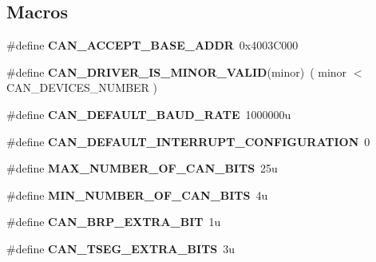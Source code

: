 \subsection*{Macros}
\begin{DoxyCompactItemize}
\item 
\mbox{\label{can-defs_8h_a551b07be3174f148c975a19fafe8d1cb}} 
\#define {\bfseries C\+A\+N\+\_\+\+A\+C\+C\+E\+P\+T\+\_\+\+B\+A\+S\+E\+\_\+\+A\+D\+DR}~0x4003\+C000
\item 
\mbox{\label{can-defs_8h_a30cc07249a05ab31dc3b727672c1c99f}} 
\#define {\bfseries C\+A\+N\+\_\+\+D\+R\+I\+V\+E\+R\+\_\+\+I\+S\+\_\+\+M\+I\+N\+O\+R\+\_\+\+V\+A\+L\+ID}(minor)~( minor $<$ C\+A\+N\+\_\+\+D\+E\+V\+I\+C\+E\+S\+\_\+\+N\+U\+M\+B\+ER )
\item 
\mbox{\label{can-defs_8h_a62afe677ba393f2f36c657982e986afd}} 
\#define {\bfseries C\+A\+N\+\_\+\+D\+E\+F\+A\+U\+L\+T\+\_\+\+B\+A\+U\+D\+\_\+\+R\+A\+TE}~1000000u
\item 
\mbox{\label{can-defs_8h_a23ea19e9ad414132e30e5f345dd1df1b}} 
\#define {\bfseries C\+A\+N\+\_\+\+D\+E\+F\+A\+U\+L\+T\+\_\+\+I\+N\+T\+E\+R\+R\+U\+P\+T\+\_\+\+C\+O\+N\+F\+I\+G\+U\+R\+A\+T\+I\+ON}~0
\item 
\mbox{\label{can-defs_8h_a7a4151a49345fcb78ac17af9484b549b}} 
\#define {\bfseries M\+A\+X\+\_\+\+N\+U\+M\+B\+E\+R\+\_\+\+O\+F\+\_\+\+C\+A\+N\+\_\+\+B\+I\+TS}~25u
\item 
\mbox{\label{can-defs_8h_aa751c96f864ecece74dd449836afa497}} 
\#define {\bfseries M\+I\+N\+\_\+\+N\+U\+M\+B\+E\+R\+\_\+\+O\+F\+\_\+\+C\+A\+N\+\_\+\+B\+I\+TS}~4u
\item 
\mbox{\label{can-defs_8h_ab569dad4d70f84fe9d0a42f4e0074c30}} 
\#define {\bfseries C\+A\+N\+\_\+\+B\+R\+P\+\_\+\+E\+X\+T\+R\+A\+\_\+\+B\+IT}~1u
\item 
\mbox{\label{can-defs_8h_a4849ff1d967f2f048e33f59edcb492c7}} 
\#define {\bfseries C\+A\+N\+\_\+\+T\+S\+E\+G\+\_\+\+E\+X\+T\+R\+A\+\_\+\+B\+I\+TS}~3u
\item 
\mbox{\label{can-defs_8h_acb21afad959411ec1002d55fe4e1961d}} 

\end{DoxyCompactItemize}
